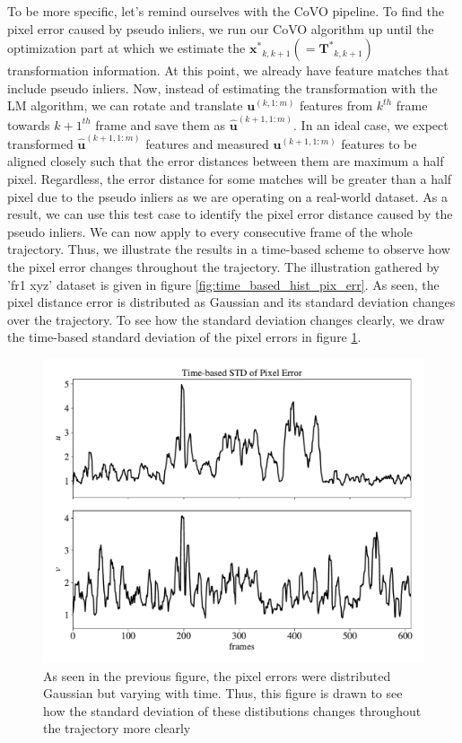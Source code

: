 \documentclass[a4paper]{report}
\numberwithin{figure}{section}
\begin{document}
To be more specific, let's remind ourselves with the CoVO pipeline.  To find 
the pixel error caused by pseudo inliers, we run our CoVO algorithm up until 
the optimization part at which we estimate the 
$\mathbf{x^*}_{k,k+1}(=\mathbf{T^*}_{k,k+1})$ transformation information.  At 
this point, we already have feature matches that include pseudo inliers.  Now, 
instead of estimating the transformation with the LM algorithm, we can rotate 
and translate $\mathbf{u}^{(k,1:m)}$ features from $k^{th}$ frame towards 
$k+1^{th}$ frame and save them as $\mathbf{\hat{u}}^{(k+1,1:m)}$.  In an ideal 
case, we expect transformed $\mathbf{\hat{u}}^{(k+1,1:m)}$ features and 
measured $\mathbf{u}^{(k+1,1:m)}$ features to be aligned closely such that the 
error distances between them are maximum a half pixel.  Regardless, the error 
distance for some matches will be greater than a half pixel due to the pseudo 
inliers as we are operating on a real-world dataset.  As a result, we can use 
this test case to identify the pixel error distance caused by the pseudo 
inliers.  We can now apply to every consecutive frame of the whole 
trajectory.  Thus, we illustrate the results in a time-based scheme to observe 
how the pixel error changes throughout the trajectory. The illustration 
gathered by 'fr1 xyz' dataset is given in figure 
\ref{fig:time_based_hist_pix_err}.  As seen, the pixel distance error is 
distributed as Gaussian and its standard deviation changes over the 
trajectory.  To see how the standard deviation changes clearly, we draw the 
time-based standard deviation of the pixel errors in figure 
\ref{fig:time_based_std_pix_err}.


\begin{figure}[H] \centering \includegraphics[width=0.8\linewidth,natwidth=640,natheight=640] {fig/eva_graphs/tum_fr1_xyz_tbased_uv_err_std.pdf} \caption[The Standard Deviations of Pixel Errors] {As seen in the previous figure, the pixel errors were distributed Gaussian but varying with time. Thus, this figure is drawn to see how the standard deviation of these distibutions changes throughout the trajectory more clearly }\label{fig:time_based_std_pix_err} \end{figure}
\end{document}
